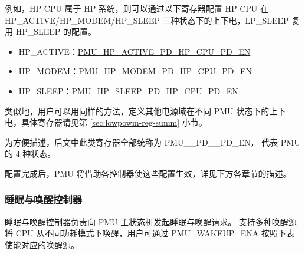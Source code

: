 \documentclass[main\_\_CN.tex]{subfiles}
\begin{document}
例如，HP CPU 属于 HP 系统，则可以通过以下寄存器配置 HP CPU 在 HP\_ACTIVE/HP\_MODEM/HP\_SLEEP 三种状态下的上下电，LP\_SLEEP 复用 HP\_SLEEP 的配置。

\begin{itemize}
    \item HP\_ACTIVE：\hyperref[fielddesc:PMUHPACTIVEPDHPCPUPDEN]{PMU\_HP\_ACTIVE\_PD\_HP\_CPU\_PD\_EN}
    \item HP\_MODEM：\hyperref[fielddesc:PMUHPMODEMPDHPCPUPDEN]{PMU\_HP\_MODEM\_PD\_HP\_CPU\_PD\_EN}
    \item HP\_SLEEP：\hyperref[fielddesc:PMUHPSLEEPPDHPCPUPDEN]{PMU\_HP\_SLEEP\_PD\_HP\_CPU\_PD\_EN}
\end{itemize}

类似地，用户可以用同样的方法，定义其他电源域在不同 PMU 状态下的上下电，具体寄存器请见第 \ref{sec:lowpowm-reg-summ} 小节。

\begin{tiplisting}
为方便描述，后文中此类寄存器全部统称为 PMU\_\_PD\_\_PD\_EN， 代表 PMU 的 4 种状态。
\end{tiplisting}

配置完成后，PMU 将借助各控制器使这些配置生效，详见下方各章节的描述。

\subsubsection{睡眠与唤醒控制器}

睡眠与唤醒控制器负责向 PMU 主状态机发起睡眠与唤醒请求。\chipname{} 支持多种唤醒源将 CPU 从不同功耗模式下唤醒，用户可通过 \hyperref[fielddesc:PMUWAKEUPENA]{PMU\_WAKEUP\_ENA} 按照下表使能对应的唤醒源。
\end{document}
